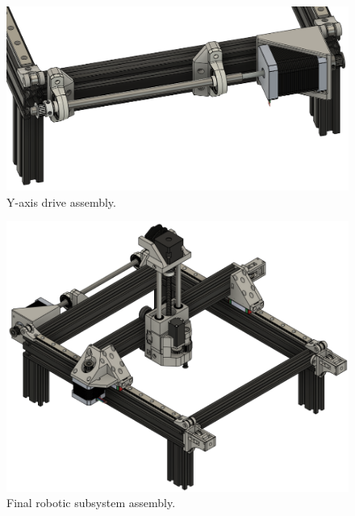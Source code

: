 \begin{figure}[H]
	\centering
	\includegraphics[width=0.7\linewidth]{figures/y-axis-drive-assembly.png}
	\caption{Y-axis drive assembly.}
	\label{fig:y-axis-drive-assembly}
\end{figure}

\begin{figure}[H]
	\centering
	\includegraphics[width=0.9\linewidth]{figures/final-assembly.png}
	\caption{Final robotic subsystem assembly.}
	\label{fig:final-assembly}
\end{figure}

